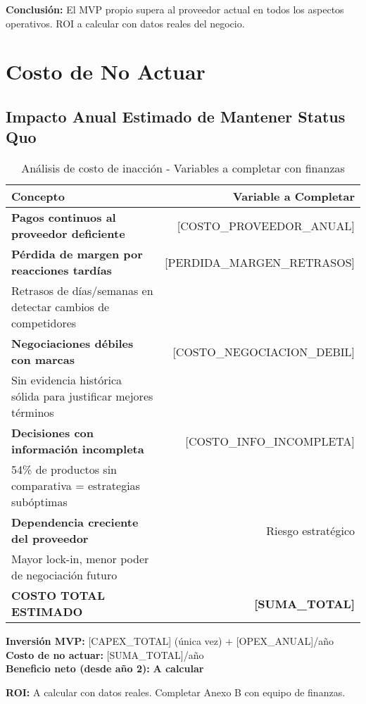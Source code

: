 \documentclass[12pt,a4paper]{article}
\begin{document}
\textbf{Conclusión:} El MVP propio supera al proveedor actual en todos los aspectos operativos. ROI a calcular con datos reales del negocio.

\newpage
\section{Costo de No Actuar}

\subsection{Impacto Anual Estimado de Mantener Status Quo}

\begin{table}[h]
\centering
\begin{tabularx}{\textwidth}{|X|r|}
\hline
\rowcolor{dangerred!20}
\textbf{Concepto} & \textbf{Variable a Completar} \\
\hline
\textbf{Pagos continuos al proveedor deficiente} & [COSTO\_PROVEEDOR\_ANUAL] \\
\hline
\textbf{Pérdida de margen por reacciones tardías} & [PERDIDA\_MARGEN\_RETRASOS] \\
\small{Retrasos de días/semanas en detectar cambios de competidores} & \\
\hline
\textbf{Negociaciones débiles con marcas} & [COSTO\_NEGOCIACION\_DEBIL] \\
\small{Sin evidencia histórica sólida para justificar mejores términos} & \\
\hline
\textbf{Decisiones con información incompleta} & [COSTO\_INFO\_INCOMPLETA] \\
\small{54\% de productos sin comparativa = estrategias subóptimas} & \\
\hline
\textbf{Dependencia creciente del proveedor} & Riesgo estratégico \\
\small{Mayor lock-in, menor poder de negociación futuro} & \\
\hline
\rowcolor{dangerred!30}
\textbf{COSTO TOTAL ESTIMADO} & \textbf{[SUMA\_TOTAL]} \\
\hline
\end{tabularx}
\caption{Análisis de costo de inacción - Variables a completar con finanzas}
\end{table}

\begin{tcolorbox}[colback=warningyellow!20, colframe=warningyellow, title=\textbf{Análisis de Oportunidad}]
\textbf{Inversión MVP:} [CAPEX\_TOTAL] (única vez) + [OPEX\_ANUAL]/año\\
\textbf{Costo de no actuar:} [SUMA\_TOTAL]/año\\
\textbf{Beneficio neto (desde año 2):} \textcolor{successgreen}{\textbf{A calcular}}

\vspace{0.3cm}
\textbf{ROI:} A calcular con datos reales. Completar Anexo B con equipo de finanzas.
\end{tcolorbox}
\end{document}

